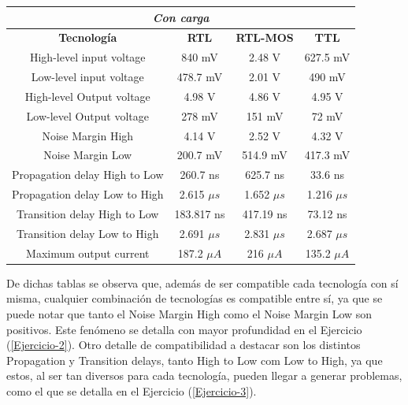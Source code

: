 \begin{table}[H]
\centering
\begin{tabular}{c|ccc}
\hline
\multicolumn{4}{|c|}{\textit{Con carga}}                                                                         \\ \hline
\multicolumn{1}{|c|}{\textbf{Tecnología}} & \textbf{RTL}  & \textbf{RTL-MOS} & \multicolumn{1}{c|}{\textbf{TTL}} \\ \hline
High-level input voltage                  & 840 mV        & 2.48 V           & 627.5 mV                          \\
Low-level input voltage                   & 478.7 mV      & 2.01 V         &    490 mV                         \\
High-level Output voltage                 & 4.98 V        & 4.86 V          & 4.95 V                            \\
Low-level Output voltage                  & 278 mV        & 151 mV           & 72 mV                             \\
Noise Margin High                         & 4.14 V        & 2.52 V           & 4.32 V                            \\
Noise Margin Low                          & 200.7 mV      & 514.9 mV         & 417.3 mV                          \\
Propagation delay High to Low             & 260.7 ns      & 625.7 ns         & 33.6 ns \\
Propagation delay Low to High             & 2.615 $\mu s$ & 1.652 $\mu s$    & 1.216 $\mu s$                     \\
Transition delay High to Low              & 183.817 ns    & 417.19 ns        & 73.12 ns                          \\
Transition delay Low to High              & 2.691 $\mu s$ & 2.831 $\mu s$    & 2.687 $\mu s$                     \\
Maximum output current                    &  187.2 $\mu A$             &     216 $\mu A$             &   135.2 $\mu A$       \\
\hline                        
\end{tabular}
\end{table}
 
De dichas tablas se observa que, además de ser compatible cada tecnología con sí misma, cualquier combinación de tecnologías es compatible entre sí, ya que se puede notar que tanto el Noise Margin High como el Noise Margin Low son positivos. Este fenómeno se detalla con mayor profundidad en el Ejercicio (\ref{Ejercicio-2}). Otro detalle de compatibilidad a destacar son los distintos Propagation y Transition delays, tanto High to Low com Low to High, ya que estos, al ser tan diversos para cada tecnología, pueden llegar a generar problemas, como el que se detalla en el Ejercicio (\ref{Ejercicio-3}).